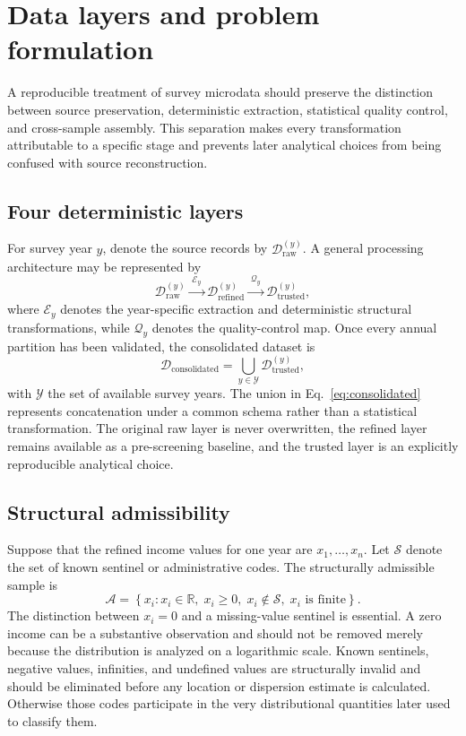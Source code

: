 \documentclass[12pt]{article}
\newcommand{\be}{\begin{equation}}
\newcommand{\ee}{\end{equation}}
\newcommand{\R}{\mathbb{R}}
\numberwithin{equation}{section}
\begin{document}
\section{Data layers and problem formulation}

A reproducible treatment of survey microdata should preserve the distinction between source preservation, deterministic extraction, statistical quality control, and cross-sample assembly. This separation makes every transformation attributable to a specific stage and prevents later analytical choices from being confused with source reconstruction.

\subsection{Four deterministic layers}

For survey year $y$, denote the source records by $\mathcal{D}^{(y)}_{\mathrm{raw}}$. A general processing architecture may be represented by
\be
\mathcal{D}^{(y)}_{\mathrm{raw}}
\xrightarrow{\;\mathcal{E}_y\;}
\mathcal{D}^{(y)}_{\mathrm{refined}}
\xrightarrow{\;\mathcal{Q}_y\;}
\mathcal{D}^{(y)}_{\mathrm{trusted}},
\label{eq:layers-year}
\ee
where $\mathcal{E}_y$ denotes the year-specific extraction and deterministic structural transformations, while $\mathcal{Q}_y$ denotes the quality-control map. Once every annual partition has been validated, the consolidated dataset is
\be
\mathcal{D}_{\mathrm{consolidated}}
=
\bigcup_{y\in\mathcal{Y}}
\mathcal{D}^{(y)}_{\mathrm{trusted}},
\label{eq:consolidated}
\ee
with $\mathcal{Y}$ the set of available survey years. The union in Eq.~\eqref{eq:consolidated} represents concatenation under a common schema rather than a statistical transformation. The original raw layer is never overwritten, the refined layer remains available as a pre-screening baseline, and the trusted layer is an explicitly reproducible analytical choice.

\subsection{Structural admissibility}

Suppose that the refined income values for one year are $x_1,\ldots,x_n$. Let $\mathcal{S}$ denote the set of known sentinel or administrative codes. The structurally admissible sample is
\be
\mathcal{A}
=
\left\{
 x_i:
 x_i\in\R,
\; x_i\geq 0,
\; x_i\notin\mathcal{S},
\; x_i\text{ is finite}
\right\}.
\label{eq:admissible-set}
\ee
The distinction between $x_i=0$ and a missing-value sentinel is essential. A zero income can be a substantive observation and should not be removed merely because the distribution is analyzed on a logarithmic scale. Known sentinels, negative values, infinities, and undefined values are structurally invalid and should be eliminated before any location or dispersion estimate is calculated. Otherwise those codes participate in the very distributional quantities later used to classify them.
\end{document}
